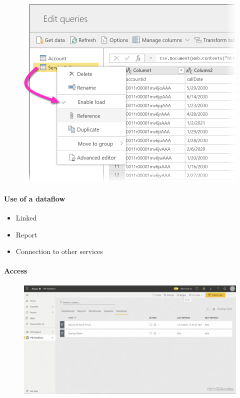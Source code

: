 \begin{figure}[H]
	\centering
	\includegraphics[scale = 0.3]{attachment/chapter_1/Scc139}
\end{figure}

\paragraph{Use of a dataflow}
\begin{itemize}
	\item Linked
	\item Report
	\item Connection to other services
\end{itemize}


\paragraph{Access}

\begin{figure}[H]
	\centering
	\includegraphics[scale = 0.3]{attachment/chapter_1/Scc142}
\end{figure}

